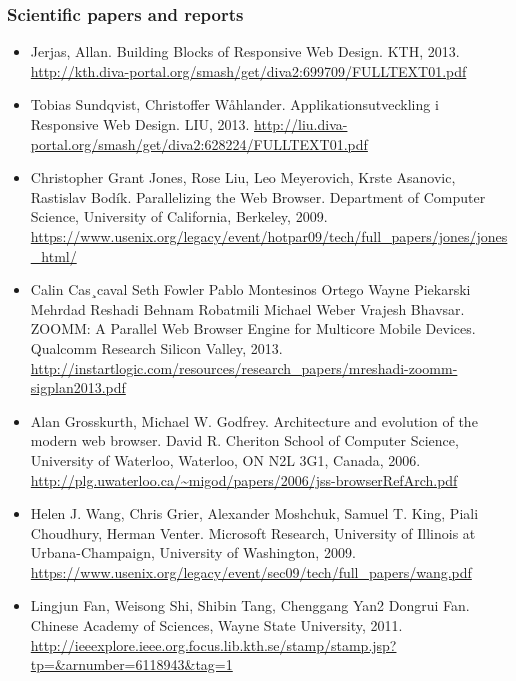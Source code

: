 \documentclass[oneside,a4paper,11pt]{kth-mag}
\begin{document}
\subsubsection*{Scientific papers and reports}
\begin{itemize}
\item Jerjas, Allan. Building Blocks of Responsive Web Design. KTH, 2013. \url{http://kth.diva-portal.org/smash/get/diva2:699709/FULLTEXT01.pdf}
\item Tobias Sundqvist, Christoffer Wåhlander. Applikationsutveckling i Responsive Web Design. LIU, 2013. \url{http://liu.diva-portal.org/smash/get/diva2:628224/FULLTEXT01.pdf}
\item Christopher Grant Jones, Rose Liu, Leo Meyerovich, Krste Asanovic, Rastislav Bodík. Parallelizing the Web Browser. Department of Computer Science, University of California, Berkeley, 2009. \url{https://www.usenix.org/legacy/event/hotpar09/tech/full_papers/jones/jones_html/}
\item Calin Cas¸caval Seth Fowler Pablo Montesinos Ortego Wayne Piekarski Mehrdad Reshadi Behnam Robatmili Michael Weber Vrajesh Bhavsar. ZOOMM: A Parallel Web Browser Engine for Multicore Mobile Devices. Qualcomm Research Silicon Valley, 2013. \url{http://instartlogic.com/resources/research_papers/mreshadi-zoomm-sigplan2013.pdf}
\item Alan Grosskurth, Michael W. Godfrey. Architecture and evolution of the
modern web browser. David R. Cheriton School of Computer Science, University of Waterloo, Waterloo, ON N2L 3G1, Canada, 2006. \url{http://plg.uwaterloo.ca/~migod/papers/2006/jss-browserRefArch.pdf}
\item Helen J. Wang, Chris Grier, Alexander Moshchuk, Samuel T. King, Piali Choudhury, Herman Venter. Microsoft Research, University of Illinois at Urbana-Champaign, University of Washington, 2009. \url{https://www.usenix.org/legacy/event/sec09/tech/full_papers/wang.pdf}
\item Lingjun Fan, Weisong Shi, Shibin Tang, Chenggang Yan2 Dongrui Fan. Chinese Academy of Sciences, Wayne State University, 2011. \url{http://ieeexplore.ieee.org.focus.lib.kth.se/stamp/stamp.jsp?tp=&arnumber=6118943&tag=1}
\end{itemize}
\end{document}
